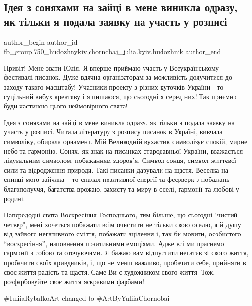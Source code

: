  
 
 
 
 

\subsection{Ідея з соняхами на зайці в мене виникла одразу, як тільки я подала заявку на участь у розписі}
\label{sec:05_04_2018.fb.fb_group.750_hudozhnykiv.2.zajec_sonjahy}
 
\ifcmt
 author_begin
   author_id fb_group.750_hudozhnykiv,chornobaj_julia.kyiv.hudozhnik
 author_end
\fi

Привіт! Мене звати Юлія. Я вперше приймаю участь у Всеукраїнському фестивалі
писанок. Дуже вдячна організаторам за можливість долучитися до заходу такого
масштабу! Учасники проекту з різних куточків України - то суцільний вибух
креативу і я пишаюся, що сьогодні я серед них! Так приємно буди частиною цього
неймовірного свята!

Ідея з соняхами на зайці в мене виникла одразу, як тільки я подала заявку на
участь у розписі. Читала літературу з розпису писанок в Україні, вивчала
символіку, обирала орнамент. Мій Великодній вухастик символізує спокій, мирне
небо та гармонію.  Сонях, як знак на писанках стародавньої України, вважається
лікувальним символом, побажанням здоров’я. Символ сонця, символ життєвої сили
та відродження природи. Такі писанки дарували на щастя. Веселка на спинці мого
зайчика – то спалах позитивної енергії та феєрверк з побажань благополуччя,
багатства врожаю, захисту та миру в оселі, гармонії та любові у родині.

Напередодні свята Воскресіння Господнього, тим більше, що сьогодні "чистий
четвер", мені хочеться побажати всім очистити не тільки свою оселю, а й душу
від зайвого негативного сміття, побажати зцілення і, так би мовити, особистого
\enquote{воскресіння}, наповнення позитивними емоціями. Адже всі ми прагнемо гармонії з
собою та оточуючими. Я бажаю вам відпустити негатив зі свого життя, пробачити
своїх кривдників, і, що не менш важливо, пробачити себе, прийняти в своє життя
радість та щастя. Саме Ви є художником свого життя! Тож, розфарбовуйте своє
життя яскравими фарбами!

\#IuliiaRybalkoArt changed to \#ArtByYuliiaChornobai

